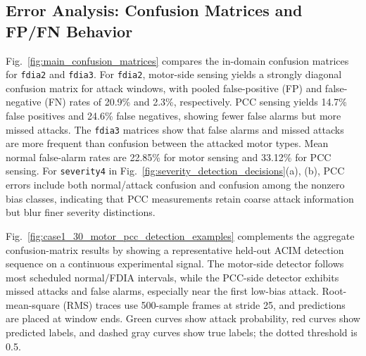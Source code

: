 \documentclass[letterpaper,journal]{IEEEtran}
\begin{document}
\subsection{Error Analysis: Confusion Matrices and FP/FN Behavior}
\label{sec:error_analysis}

Fig.~\ref{fig:main_confusion_matrices} compares the in-domain confusion matrices for \texttt{fdia2} and \texttt{fdia3}. For \texttt{fdia2}, motor-side sensing yields a strongly diagonal confusion matrix for attack windows, with pooled false-positive (FP) and false-negative (FN) rates of 20.9\% and 2.3\%, respectively. PCC sensing yields 14.7\% false positives and 24.6\% false negatives, showing fewer false alarms but more missed attacks. The \texttt{fdia3} matrices show that false alarms and missed attacks are more frequent than confusion between the attacked motor types. Mean normal false-alarm rates are 22.85\% for motor sensing and 33.12\% for PCC sensing. For \texttt{severity4} in Fig.~\ref{fig:severity_detection_decisions}(a), (b), PCC errors include both normal/attack confusion and confusion among the nonzero bias classes, indicating that PCC measurements retain coarse attack information but blur finer severity distinctions.

Fig.~\ref{fig:case1_30_motor_pcc_detection_examples} complements the aggregate confusion-matrix results by showing a representative held-out ACIM detection sequence on a continuous experimental signal. The motor-side detector follows most scheduled normal/FDIA intervals, while the PCC-side detector exhibits missed attacks and false alarms, especially near the first low-bias attack. Root-mean-square (RMS) traces use 500-sample frames at stride 25, and predictions are placed at window ends. Green curves show attack probability, red curves show predicted labels, and dashed gray curves show true labels; the dotted threshold is 0.5.
\end{document}
